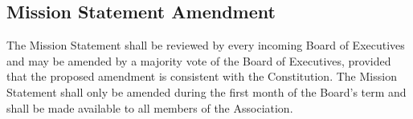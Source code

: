 \subsection{Mission Statement Amendment}
The Mission Statement shall be reviewed
by every incoming Board of Executives and may be amended by a majority
vote of the Board of Executives, provided that the proposed amendment 
is consistent with the Constitution. The Mission Statement shall only
be amended during the first month of the Board's term and shall be made 
available to all members of the Association.